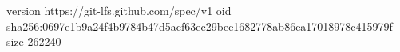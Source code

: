 version https://git-lfs.github.com/spec/v1
oid sha256:0697e1b9a24f4b9784b47d5acf63ec29bee1682778ab86ea17018978c415979f
size 262240
